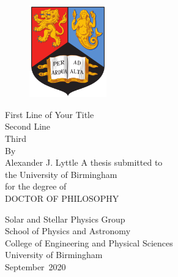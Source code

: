 \thispagestyle{empty}
\providecommand\pdfbookmark[3][]{} \pdfbookmark[0]{Title Page}{bm:Title}
\vspace*{1cm}
\begin{figure}[ht!]
    \centering
    \includegraphics[height=4cm]{frontmatter/images/BirminghamUniversityCrest.png}
\end{figure}
\vfill
\begin{center}
{\huge{First Line of Your Title}}\\[0.5em]
{\huge{Second Line}}\\[0.5em]
{\huge{Third}}\\[0.5em]
\vfill
By\\[\baselineskip]
{\Large{Alexander J. Lyttle}}
\vfill
A thesis submitted to\\[-0.8em]
the University of Birmingham\\[-0.8em]
for the  degree of\\[-0.8em]
\MakeUppercase{Doctor of Philosophy} \\[\baselineskip]
\end{center}
\begin{center}
Solar and Stellar Physics Group\\[-0.8em]
School of Physics and Astronomy\\[-0.8em]
College of Engineering and Physical Sciences\\[-0.8em]
University of Birmingham\\[-0.8em]
September~2020 \\[\baselineskip]
\end{center}
\clearpage

